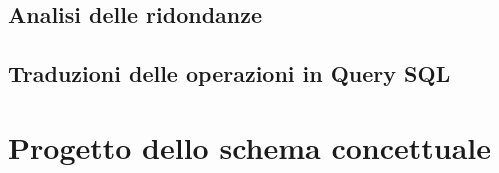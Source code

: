 \documentclass{article}
\begin{document}
\subsection{Analisi delle ridondanze}

\subsection{Traduzioni delle operazioni in Query SQL}


\section{Progetto dello schema concettuale}


% 
\end{document}
